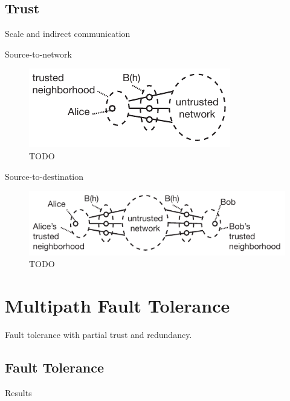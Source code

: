 \documentclass[prodmode,permissions]{acmsmall-ec16}
\begin{document}
\subsection{Trust}

Scale and indirect communication

Source-to-network
\begin{figure}
\centerline{\includegraphics{fig-trust-source}}
\caption{TODO}
\label{fig:trust-source}
\end{figure}

Source-to-destination
\begin{figure}
\centerline{\includegraphics{fig-trust-source-destination}}
\caption{TODO}
\label{fig:trust-source-destionation}
\end{figure}

\section{Multipath Fault Tolerance}

Fault tolerance with partial trust and redundancy.

\subsection{Fault Tolerance}

Results
\end{document}
